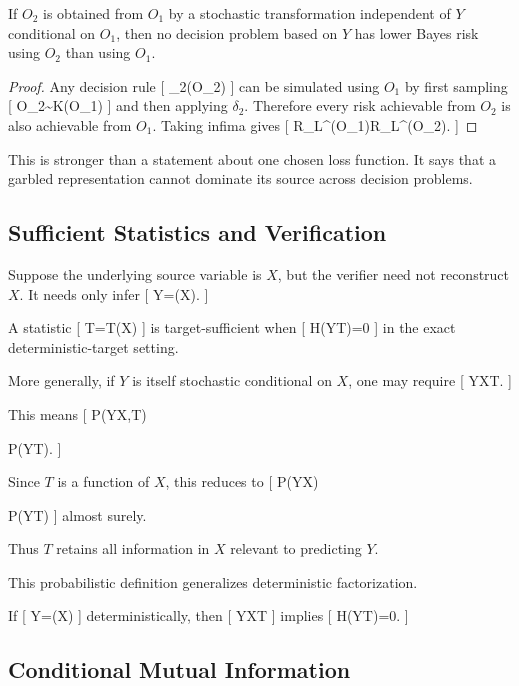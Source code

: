 \documentclass[11pt]{article}
\begin{document}
\begin{proposition}
If $O_2$ is obtained from $O_1$ by a stochastic transformation independent of $Y$ conditional on $O_1$, then no decision problem based on $Y$ has lower Bayes risk using $O_2$ than using $O_1$.
\end{proposition}

\begin{proof}
Any decision rule
[
\delta_2(O_2)
]
can be simulated using $O_1$ by first sampling
[
O_2\sim K(\cdot\mid O_1)
]
and then applying $\delta_2$. Therefore every risk achievable from $O_2$ is also achievable from $O_1$. Taking infima gives
[
R_L^\star(O_1)\leq R_L^\star(O_2).
]
\end{proof}

This is stronger than a statement about one chosen loss function. It says that a garbled representation cannot dominate its source across decision problems.

\subsection{Sufficient Statistics and Verification}

Suppose the underlying source variable is $X$, but the verifier need not reconstruct $X$. It needs only infer
[
Y=\Phi(X).
]

A statistic
[
T=T(X)
]
is target-sufficient when
[
H(Y\mid T)=0
]
in the exact deterministic-target setting.

More generally, if $Y$ is itself stochastic conditional on $X$, one may require
[
Y\perp X\mid T.
]

This means
[
P(Y\mid X,T)

P(Y\mid T).
]

Since $T$ is a function of $X$, this reduces to
[
P(Y\mid X)

P(Y\mid T)
]
almost surely.

Thus $T$ retains all information in $X$ relevant to predicting $Y$.

This probabilistic definition generalizes deterministic factorization.

If
[
Y=\Phi(X)
]
deterministically, then
[
Y\perp X\mid T
]
implies
[
H(Y\mid T)=0.
]

\subsection{Conditional Mutual Information}
\end{document}
